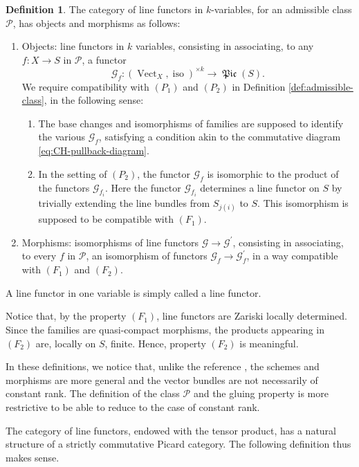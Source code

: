 \documentclass[JEP,XML,SOM,Unicode,published]{cedram}
\theoremstyle{plain}
\theoremstyle{definition}
\newtheorem{definition}[theorem]{Definition}
\newcommand{\Gcal}{\mathcal G}
\newcommand{\Pcal}{\mathcal P}
\DeclareMathOperator{\Picfr}{\mathfrak{Pic}}
\DeclareMathOperator{\iso}{iso}
\DeclareMathOperator{\Vect}{Vect}
\begin{document}
\begin{definition}
The category of line functors in $k$-variables, for an admissible class $\Pcal$, has objects and morphisms as follows:
\begin{enumerate}
\item Objects: line functors in $k$ variables, consisting in associating, to any $f\colon X \to S$ in $\Pcal$, a functor
\begin{equation} \label{def:determinantfunctor}
\Gcal_f \colon (\Vect_{X}, \iso)^{\times k} \to \Picfr(S).
\end{equation}
We require compatibility with $(P_1)$ and $(P_2)$ in Definition \ref{def:admissible-class}, in the following sense:
\begin{enumerate}
\item[$(F_1)$] The base changes and isomorphisms of families are supposed to identify the various $\Gcal_{f}$, satisfying a condition akin to the commutative diagram \eqref{eq:CH-pullback-diagram}.
\item[$(F_2)$] In the setting of $(P_2)$, the functor $\Gcal_f$ is isomorphic to the product of the functors $\Gcal_{f_i}$. Here the functor $\Gcal_{f_i}$ determines a line functor on $S$ by trivially extending the line bundles from $S_{j(i)}$ to $S$. This isomorphism is supposed to be compatible with $(F_1)$.
\end{enumerate}
\item Morphisms: isomorphisms of line functors $\Gcal\to\Gcal^{\prime}$, consisting in associating, to every $f$ in $\Pcal$, an isomorphism of functors $\Gcal_{f}\to\Gcal_{f}^{\prime}$, in a way compatible with $(F_{1})$ and $(F_{2})$.
\end{enumerate}
A line functor in one variable is simply called a line functor.
\end{definition}
Notice that, by the property $(F_{1})$, line functors are Zariski locally determined. Since the families are quasi-compact morphisms, the products appearing in $(F_2)$ are, locally on $S$, finite. Hence, property $(F_2)$ is meaningful.

In these definitions, we notice that, unlike the reference \cite{Eriksson-Freixas-Wentworth}, the schemes and morphisms are more general and the vector bundles are not necessarily of constant rank. The definition of the class $\Pcal$ and the gluing property is more restrictive to be able to reduce to the case of constant rank.

The category of line functors, endowed with the tensor product, has a natural structure of a strictly commutative Picard category. The following definition thus makes sense.
\end{document}
